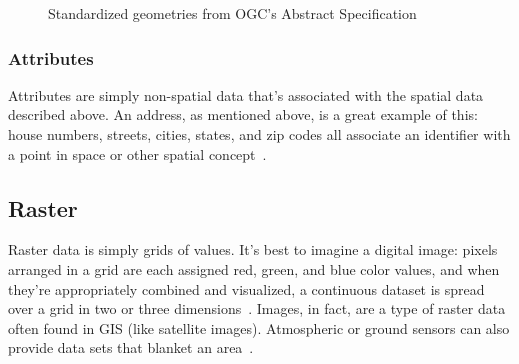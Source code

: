 \begin{figure}
      \hfill
        \hfill
{}
       \hfill
{}
    
    \caption{Standardized geometries from OGC's Abstract Specification}
    \label{fig:geoms}
    
\end{figure}

\subsubsection{Attributes}
Attributes are simply non-spatial data that's associated with the spatial data described above. An address, as mentioned above, is a great example of this: house numbers, streets, cities, states, and zip codes all associate an identifier with a point in space or other spatial concept~\cite{gentle_intro}.

\subsection{Raster}
Raster data is simply grids of values. It's best to imagine a digital image: pixels arranged in a grid are each assigned red, green, and blue color values, and when they're appropriately combined and visualized, a continuous dataset is spread over a grid in two or three dimensions~\cite{gentle_intro}. Images, in fact, are a type of raster data often found in GIS (like satellite images). Atmospheric or ground sensors can also provide data sets that blanket an area~\cite{gentle_intro}.

